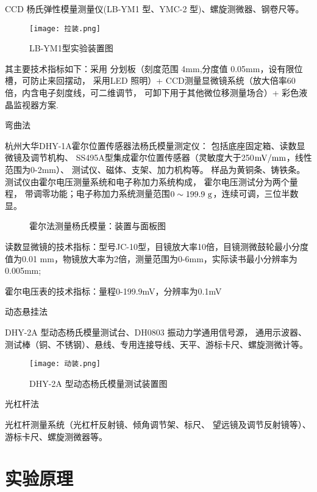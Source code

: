 \documentclass[11pt]{article}
\begin{document}
CCD 杨氏弹性模量测量仪(LB-YM1 型、YMC-2 型)、螺旋测微器、钢卷尺等。
\begin{figure}[H]
    \centering
    \texttt{[image: 拉装.png]}
    \caption{LB-YM1型实验装置图}
\end{figure}

其主要技术指标如下：采用
分划板（刻度范围 4mm,分度值 0.05mm，设有限位槽，可防止来回摆动，
采用LED 照明）+
CCD测量显微镜系统（放大倍率60倍，内含电子刻度线，可二维调节，
可卸下用于其他微位移测量场合）+
彩色液晶监视器方案.


\bigskip
\noindent 弯曲法

杭州大华DHY-1A霍尔位置传感器法杨氏模量测定仪：
包括底座固定箱、读数显微镜及调节机构、
SS495A型集成霍尔位置传感器（灵敏度大于250$\rm mV/mm$，线性范围为0-2mm）、
测试仪、磁体、支架、加力机构等。
样品为黄铜条、铸铁条。
测试仪由霍尔电压测量系统和电子称加力系统构成，
霍尔电压测试分为两个量程，
带调零功能；电子称加力系统测量范围$0\sim199.9\,\,{\rm g}$，连续可调，三位半数显。

\begin{figure}[H]
    \centering
    \hspace{0.5cm}
    \caption{霍尔法测量杨氏模量：装置与面板图}
\end{figure}

读数显微镜的技术指标：型号JC-10型，目镜放大率10倍，目镜测微鼓轮最小分度值为0.01 mm，物镜放大率为2倍，测量范围为0-6mm，实际读书最小分辨率为0.005mm;

霍尔电压表的技术指标：量程0-199.9mV，分辨率为0.1mV

\bigskip
\noindent 动态悬挂法

DHY-2A 型动态杨氏模量测试台、DH0803 振动力学通用信号源，
通用示波器、
测试棒（铜、不锈钢）、悬线、专用连接导线、天平、游标卡尺、螺旋测微计等。
\begin{figure}[H]
    \centering
    \texttt{[image: 动装.png]}
    \caption{DHY-2A 型动态杨氏模量测试装置图}
\end{figure}

\bigskip
\noindent 光杠杆法

光杠杆测量系统（光杠杆反射镜、倾角调节架、标尺、
望远镜及调节反射镜等）、游标卡尺、螺旋测微器等。

\section{实验原理}
\end{document}
